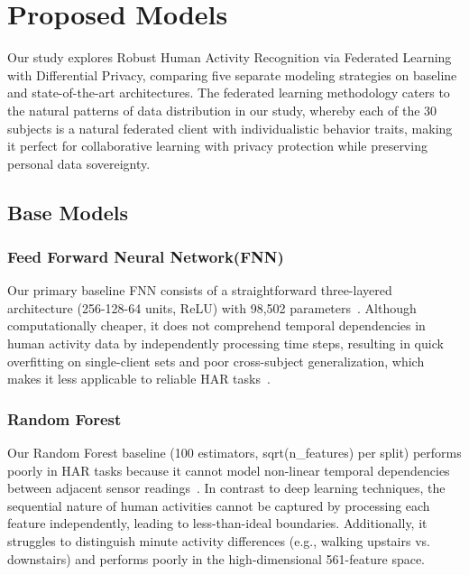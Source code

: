 
\section{Proposed Models}
\label{sec:models}

Our study explores Robust Human Activity Recognition via Federated Learning with Differential Privacy, comparing five separate modeling strategies on baseline and state-of-the-art architectures. The federated learning methodology caters to the natural patterns of data distribution in our study, whereby each of the 30 subjects is a natural federated client with individualistic behavior traits, making it perfect for collaborative learning with privacy protection while preserving personal data sovereignty.

\subsection{Base Models}
\label{subsec:base_models}

\subsubsection{Feed Forward Neural Network(FNN)}
\label{subsubsec:fnn_model}

Our primary baseline FNN consists of a straightforward three-layered architecture (256-128-64 units, ReLU) with 98,502 parameters~\cite{goodfellow2016deep}. Although computationally cheaper, it does not comprehend temporal dependencies in human activity data by independently processing time steps, resulting in quick overfitting on single-client sets and poor cross-subject generalization, which makes it less applicable to reliable HAR tasks~\cite{pedregosa2011scikit}.

\subsubsection{Random Forest}
\label{subsubsec:rf_model}

Our Random Forest baseline (100 estimators, sqrt(n\_features) per split) performs poorly in HAR tasks because it cannot model non-linear temporal dependencies between adjacent sensor readings~\cite{breiman2001random}. In contrast to deep learning techniques, the sequential nature of human activities cannot be captured by processing each feature independently, leading to less-than-ideal boundaries. Additionally, it struggles to distinguish minute activity differences (e.g., walking upstairs vs. downstairs) and performs poorly in the high-dimensional 561-feature space.

